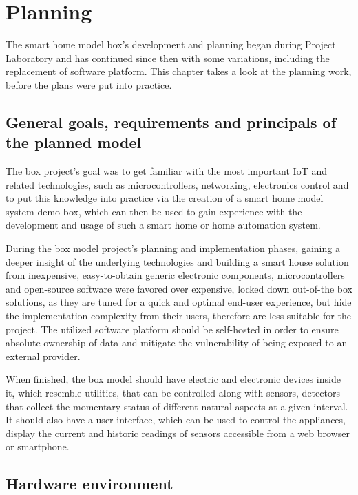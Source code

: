 \chapter{Planning}

The smart home model box's development and planning began during Project Laboratory and has continued since then with some variations, including the replacement of software platform. This chapter takes a look at the planning work, before the plans were put into practice.

\section{General goals, requirements and principals of the planned model}

The box project's goal was to get familiar with the most important IoT and related technologies, such as microcontrollers, networking, electronics control and to put this knowledge into practice via the creation of a smart home model system demo box, which can then be used to gain experience with the development and usage of such a smart home or home automation system.

During the box model project's planning and implementation phases, gaining a deeper insight of the underlying technologies and building a smart house solution from inexpensive, easy-to-obtain generic electronic components, microcontrollers and open-source software were favored over expensive, locked down out-of-the box solutions, as they are tuned for a quick and optimal end-user experience, but hide the implementation complexity from their users, therefore are less suitable for the project. The utilized software platform should be self-hosted in order to ensure absolute ownership of data and mitigate the vulnerability of being exposed to an external provider.

When finished, the box model should have electric and electronic devices inside it, which resemble utilities, that can be controlled along with sensors, detectors that collect the momentary status of different natural aspects at a given interval. It should also have a user interface, which can be used to control the appliances, display the current and historic readings of sensors accessible from a web browser or smartphone.

\section{Hardware environment}

